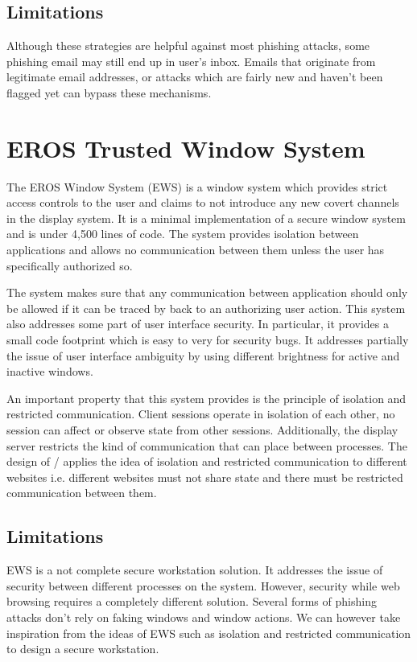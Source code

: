 \subsection{Limitations}

Although these strategies are helpful against most phishing attacks, some phishing email may still end up in user's inbox. Emails that originate from legitimate email addresses, or attacks which are fairly new and haven't been flagged yet can bypass these mechanisms.

\section{EROS Trusted Window System}

The EROS Window System (EWS) \cite{eros} is a window system which provides strict access controls to the user and claims to not introduce any new covert channels in the display system. It is a minimal implementation of a secure window system and is under 4,500 lines of code. The system provides isolation between applications and allows no communication between them unless the user has specifically authorized so.

The system makes sure that any communication between application should only be allowed if it can be traced by back to an authorizing user action. This system also addresses some part of user interface security. In particular, it provides a small code footprint which is easy to very for security bugs. It addresses partially the issue of user interface ambiguity by using different brightness for active and inactive windows.

An important property that this system provides is the principle of isolation and restricted communication. Client sessions operate in isolation of each other, no session can affect or observe state from other sessions. Additionally, the display server restricts the kind of communication that can place between processes. The design of \namesecureworkstation/ applies the idea of isolation and restricted communication to different websites i.e. different websites must not share state and there must be restricted communication between them.

\subsection{Limitations}

EWS is a not complete secure workstation solution. It addresses the issue of security between different processes on the system. However, security while web browsing requires a completely different solution. Several forms of phishing attacks don't rely on faking windows and window actions. We can however take inspiration from the ideas of EWS such as isolation and restricted communication to design a secure workstation.
